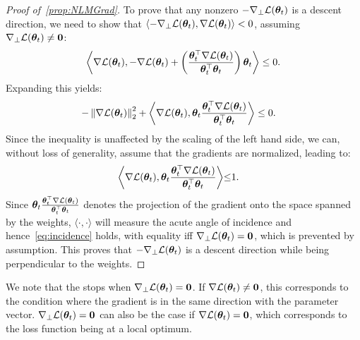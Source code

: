 \begin{proof}[Proof of~\cref{prop:NLMGrad}]
To prove that any nonzero $-\nabla_{\perp} \mathcal{L}(\bm{\theta}_t)$ is a descent direction, we need to show that $\left\langle -\nabla_{\perp} \mathcal{L}(\bm{\theta}_t), \nabla\mathcal{L}(\bm{\theta}_t) \right\rangle < 0$, assuming $\nabla_{\perp} \mathcal{L}(\bm{\theta}_t) \neq \mathbf{0}$:
    \begin{equation}
        \left\langle \nabla\mathcal{L}(\bm{\theta}_t), -\nabla\mathcal{L}(\bm{\theta}_t) + \left( \frac{\bm{\theta}_t^\top \nabla \mathcal{L}(\bm{\theta}_t)}{\bm{\theta}_t^\top \bm{\theta}_t} \right)\bm{\theta}_t  \right\rangle \leq 0.
    \end{equation}
    Expanding this yields:
    \begin{align}
        -\left\|\nabla\mathcal{L}(\bm{\theta}_t)\right\|^2_2 + 
        \left\langle  \nabla\mathcal{L}(\bm{\theta}_t), \bm{\theta}_t \frac{\bm{\theta}_t^\top \nabla \mathcal{L}(\bm{\theta}_t)}{\bm{\theta}_t^\top \bm{\theta}_t}\right\rangle
        &\leq 0.
    \end{align}
    Since the inequality is unaffected by the scaling of the left hand side, we can, without loss of generality, assume that the gradients are normalized, leading to:
    \begin{align}\label{eq:incidence}
        \left\langle \nabla\mathcal{L}(\bm{\theta}_t), \bm{\theta}_t \frac{\bm{\theta}_t^\top \nabla \mathcal{L}(\bm{\theta}_t)}{\bm{\theta}_t^\top \bm{\theta}_t}\right\rangle
        &{\leq} 1.
    \end{align}
    Since $\bm{\theta}_t \frac{\bm{\theta}_t^\top \nabla \mathcal{L}(\bm{\theta}_t)}{\bm{\theta}_t^\top \bm{\theta}_t}$ denotes the projection of the gradient onto the space spanned by the weights, $\langle\cdot,\cdot\rangle$ will measure the acute angle of incidence and hence~\cref{eq:incidence} holds, with equality iff $\nabla_{\perp} \mathcal{L}(\bm{\theta}_t) = \mathbf{0}$, which is prevented by assumption. This proves that $-\nabla_{\perp} \mathcal{L}(\bm{\theta}_t)$ is a descent direction while being perpendicular to the weights. %
\end{proof}
We note that the \ograd stops when $\nabla_{\perp}\mathcal{L}(\bm{\theta}_t) = \mathbf{0}$. If $\nabla\mathcal{L}(\bm{\theta}_t) \neq \mathbf{0}$, this corresponds to the condition where the gradient is in the same direction with the parameter vector. $\nabla_{\perp}\mathcal{L}(\bm{\theta}_t) = \mathbf{0}$ can also be the case if $\nabla\mathcal{L}(\bm{\theta}_t) = \mathbf{0}$, which corresponds to the loss function being at a local optimum.

